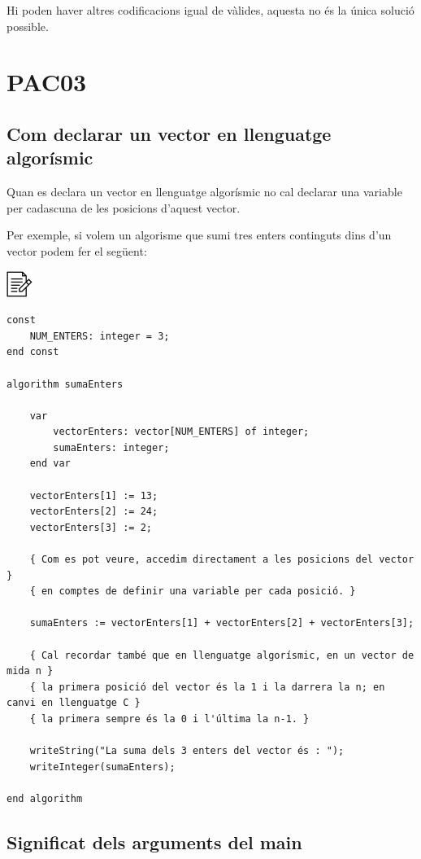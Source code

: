 \documentclass[]{book}
\begin{document}
Hi poden haver altres codificacions igual de vàlides, aquesta no és la
única solució possible.

\chapter{PAC03}\label{pac03}

\section{Com declarar un vector en llenguatge
algorísmic}\label{com-declarar-un-vector-en-llenguatge-algorismic}

Quan es declara un vector en llenguatge algorísmic no cal declarar una
variable per cadascuna de les posicions d'aquest vector.

Per exemple, si volem un algorisme que sumi tres enters continguts dins
d'un vector podem fer el següent:

\includegraphics{./img/alg.png}

\begin{verbatim}
const
    NUM_ENTERS: integer = 3;
end const

algorithm sumaEnters

    var
        vectorEnters: vector[NUM_ENTERS] of integer;
        sumaEnters: integer;
    end var

    vectorEnters[1] := 13;
    vectorEnters[2] := 24;
    vectorEnters[3] := 2;

    { Com es pot veure, accedim directament a les posicions del vector }
    { en comptes de definir una variable per cada posició. }

    sumaEnters := vectorEnters[1] + vectorEnters[2] + vectorEnters[3];

    { Cal recordar també que en llenguatge algorísmic, en un vector de mida n }
    { la primera posició del vector és la 1 i la darrera la n; en canvi en llenguatge C }
    { la primera sempre és la 0 i l'última la n-1. }

    writeString("La suma dels 3 enters del vector és : ");
    writeInteger(sumaEnters);

end algorithm
\end{verbatim}

\section{Significat dels arguments del
main}\label{significat-dels-arguments-del-main}
\end{document}
